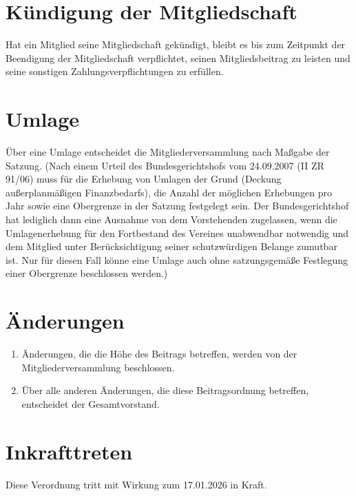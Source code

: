 \section{Kündigung der Mitgliedschaft}
Hat ein Mitglied seine Mitgliedschaft gekündigt, bleibt es bis zum Zeitpunkt der Beendigung der Mitgliedschaft verpflichtet, seinen Mitgliedsbeitrag zu leisten und seine sonstigen Zahlungsverpflichtungen zu erfüllen.

\section{Umlage}
Über eine Umlage entscheidet die Mitgliederversammlung nach Maßgabe der Satzung. (Nach einem Urteil des Bundesgerichtshofs vom 24.09.2007 (II ZR 91/06) muss für die Erhebung von Umlagen der Grund (Deckung außerplanmäßigen Finanzbedarfs), die Anzahl der möglichen Erhebungen pro Jahr sowie eine Obergrenze in der Satzung festgelegt sein. Der Bundesgerichtshof hat lediglich dann eine Ausnahme von dem Vorstehenden zugelassen, wenn die Umlagenerhebung für den Fortbestand des Vereines unabwendbar notwendig und dem Mitglied unter Berücksichtigung seiner schutzwürdigen Belange zumutbar ist. Nur für diesen Fall könne eine Umlage auch ohne satzungsgemäße Festlegung einer Obergrenze beschlossen werden.)

\section{Änderungen}
\begin{enumerate}
  \item Änderungen, die die Höhe des Beitrags betreffen, werden von der Mitgliederversammlung beschlossen.
  \item Über alle anderen Änderungen, die diese Beitragsordnung betreffen, entscheidet der Gesamtvorstand.
\end{enumerate}

\section{Inkrafttreten}
Diese Verordnung tritt mit Wirkung zum 17.01.2026 in Kraft.


